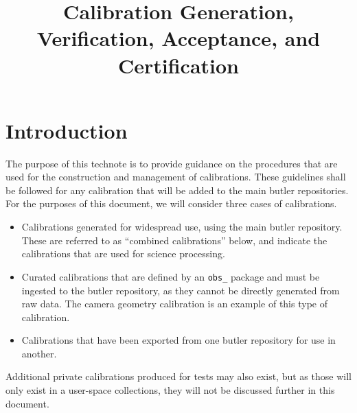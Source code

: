 \documentclass[DM,authoryear,toc]{lsstdoc}
\title{Calibration Generation, Verification, Acceptance, and Certification}
\date{\vcsDate}
\begin{document}
\maketitle


\section{Introduction}

The purpose of this technote is to provide guidance on the procedures that are used for the construction and management of calibrations.
These guidelines shall be followed for any calibration that will be added to the main butler repositories.  For the purposes of this document, we will consider three cases of calibrations.

\begin{itemize}
\item Calibrations generated for widespread use, using the main butler repository.  These are referred to as ``combined calibrations'' below, and indicate the calibrations that are used for science processing.
\item Curated calibrations that are defined by an \verb|obs_| package and must be ingested to the butler repository, as they cannot be directly generated from raw data.  The camera geometry calibration is an example of this type of calibration.
\item Calibrations that have been exported from one butler repository for use in another.
\end{itemize}

Additional private calibrations produced for tests may also exist, but as those will only exist in a user-space collections, they will not be discussed further in this document.
\end{document}
